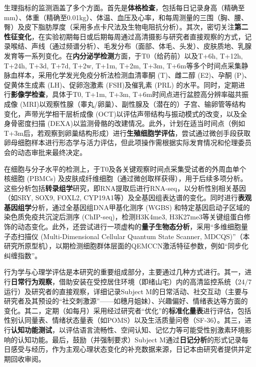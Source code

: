 生理指标的监测涵盖了多个方面。首先是\textbf{体格检查}，包括每日记录身高（精确至mm）、体重（精确至0.01kg）、体温、血压及心率，和每周测量的三围（胸、腰、臀）及皮下脂肪厚度（采用多点卡尺法及生物电阻抗分析）。其次，密切关注\textbf{第二性征变化}，在实验初期每日或后期每周通过高清摄影与研究者直接观察的方式，记录喉结、声线（通过频谱分析）、毛发分布（面部、体毛、头发）、皮肤质地、乳腺发育等一系列变化。在\textbf{内分泌学检测}方面，于T0（给药前）以及T+6h, T+12h, T+24h, T+3d, T+7d, T+2w, T+1m, T+2m, T+3m, T+6m等多个时间点采集静脉血样本，采用化学发光免疫分析法检测血清睾酮 (T)、雌二醇 (E2)、孕酮 (P)、促黄体生成素 (LH)、促卵泡激素 (FSH)及催乳素 (PRL) 的水平。同时，定期进行\textbf{影像学检查}，具体于T0, T+1m, T+3m, T+6m时间点进行盆腔高分辨率磁共振成像 (MRI)以观察性腺（睾丸/卵巢）、副性腺及（潜在的）子宫、输卵管等结构变化，声带光学相干层析成像 (OCT)以评估声带结构与振动模式的改变，以及全身骨密度扫描 (DEXA)以监测骨骼的改建情况。此外，计划在适当时间点（例如T+3m后，若观察到卵巢结构形成）进行\textbf{生殖细胞学评估}，尝试通过微创手段获取卵母细胞样本进行形态学与活力评估，但此项操作需根据实际发育情况和伦理委员会的动态审批来最终决定。

在细胞与分子水平的检测上，于T0及各关键观察时间点采集受试者的外周血单个核细胞 (PBMCs) 及皮肤成纤维细胞（通过微创取样获得），用于后续多项分析。这些分析包括\textbf{转录组学}研究，即RNA提取后进行RNA-seq，以分析性别相关基因（如SRY, SOX9, FOXL2, CYP19A1等）及全基因组表达谱的变化。同时进行\textbf{表观基因组学}分析，通过全基因组DNA甲基化测序 (WGBS) 和特定基因启动子区域的染色质免疫共沉淀后测序 (ChIP-seq)，检测H3K4me3, H3K27me3等关键组蛋白修饰的动态变化。此外，还尝试进行一项虚构的\textbf{量子生物态分析}，采用“多维细胞量子态扫描仪 (Multi-Dimensional Cellular Quantum State Scanner, MDCQS)”（本研究所原型机），以期检测细胞群体层面的QEMCCN激活特征参数，例如“同步化纠缠指数”。

行为学与心理学评估是本研究的重要组成部分，主要通过几种方式进行。其一，进行\textbf{日常行为观察}，借助安装在受控居住环境（即绪山宅）内的高清监控系统（24/7运行）及研究者的直接观察，详细记录Subject M的日常活动、社交互动（主要与研究者及其预设的“社交刺激源”——如穗月姐妹）、兴趣偏好、情绪表达等方面的变化。其二，定期（如每月）采用经过研究者“优化”的\textbf{标准化量表}进行评估，包括性别认同量表、情绪状态量表（如POMS）以及生活质量问卷（SF-36）。其三，进行\textbf{认知功能测试}，以评估语言流畅性、空间认知、记忆力等可能受性别激素环境影响的认知功能。最后，鼓励（并强制要求）Subject M通过\textbf{日记分析}的形式记录每日感受与经历，作为主观心理状态变化的补充数据来源，日记本由研究者提供并定期回收审阅。

